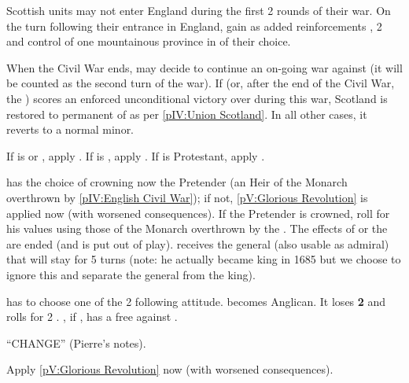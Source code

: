 \phmil
\aparag Scottish units may not enter England during the first 2 rounds of
their war.
\aparag On the turn following their entrance in England, \royal gain as added
reinforcements , 2 \LD and control of one mountainous
province in \paysecosse of their choice.

\phpaix
\aparag When the Civil War ends, \ENG may decide to continue an on-going war
against \paysecosse (it will be counted as the second turn of the war).
\aparag If \ENG (\royal or, after the end of the Civil War, the \parl) scores
an enforced unconditional victory over \paysecosse during this war, Scotland
is restored to permanent \VASSAL of \ENG as per \ref{pIV:Union Scotland}.  In
all other cases, it reverts to a normal minor.






\phevnt
\aparag If \ENG is \PROTANG or \CATHCO, apply .
\aparag If \ENG is \CATHCR, apply .
\aparag If \ENG is Protestant, apply .



\phevnt
\aparag \ENG has the choice of crowning now the Pretender (an Heir of the
Monarch overthrown by \ref{pIV:English Civil War}); if not, \ref{pV:Glorious
  Revolution} is applied now (with worsened consequences).
\aparag If the Pretender is crowned, roll for his values using those of the
Monarch overthrown by the . The effects of
 or the  are ended (and
\leaderCromwell is put out of play).
\aparag \ENG receives the general (also usable as admiral)  that will stay for 5 turns (note: he actually became king in 1685 but
we choose to ignore this and separate the general from the king).



\phevnt
\aparag \ENG has to choose one of the 2 following attitude.
\bparag \ENG becomes Anglican. It loses {\bf 2} \STAB and rolls for 2 \REVOLT
.
\bparag \SPA, if \CATHCR, has a free \CB against \ENG.
\aparag[Refusal]
\begin{todo}
  ``CHANGE'' (Pierre's notes).
\end{todo}
\bparag Apply \ref{pV:Glorious Revolution} now (with worsened consequences).


